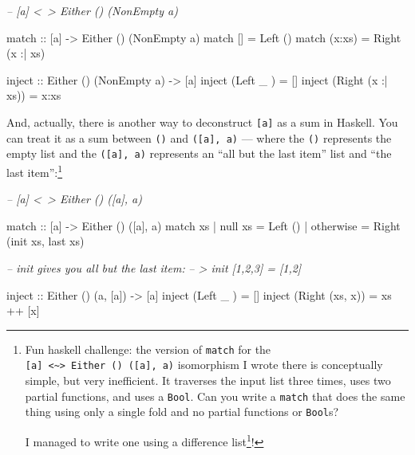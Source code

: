 \documentclass[]{article}
\newenvironment{Shaded}{}{}
\newcommand{\CommentTok}[1]{\textcolor[rgb]{0.38,0.63,0.69}{\textit{#1}}}
\newcommand{\DataTypeTok}[1]{\textcolor[rgb]{0.56,0.13,0.00}{#1}}
\newcommand{\FunctionTok}[1]{\textcolor[rgb]{0.02,0.16,0.49}{#1}}
\newcommand{\NormalTok}[1]{#1}
\newcommand{\OtherTok}[1]{\textcolor[rgb]{0.00,0.44,0.13}{#1}}
\renewcommand{\href}[2]{#2\footnote{\url{#1}}}
\begin{document}
\begin{Shaded}
\begin{Highlighting}[]
\CommentTok{-- [a] <~> Either () (NonEmpty a)}

\OtherTok{match ::}\NormalTok{ [a] }\OtherTok{->} \DataTypeTok{Either}\NormalTok{ () (}\DataTypeTok{NonEmpty}\NormalTok{ a)}
\NormalTok{match []     }\FunctionTok{=} \DataTypeTok{Left}\NormalTok{  ()}
\NormalTok{match (x}\FunctionTok{:}\NormalTok{xs) }\FunctionTok{=} \DataTypeTok{Right}\NormalTok{ (x }\FunctionTok{:|}\NormalTok{ xs)}

\OtherTok{inject ::} \DataTypeTok{Either}\NormalTok{ () (}\DataTypeTok{NonEmpty}\NormalTok{ a) }\OtherTok{->}\NormalTok{ [a]}
\NormalTok{inject (}\DataTypeTok{Left}\NormalTok{   _       ) }\FunctionTok{=}\NormalTok{ []}
\NormalTok{inject (}\DataTypeTok{Right}\NormalTok{ (x }\FunctionTok{:|}\NormalTok{ xs)) }\FunctionTok{=}\NormalTok{ x}\FunctionTok{:}\NormalTok{xs}
\end{Highlighting}
\end{Shaded}

And, actually, there is another way to deconstruct \texttt{{[}a{]}} as a sum in
Haskell. You can treat it as a sum between \texttt{()} and
\texttt{({[}a{]},\ a)} --- where the \texttt{()} represents the empty list and
the \texttt{({[}a{]},\ a)} represents an ``all but the last item'' list and
``the last item'':\footnote{Fun haskell challenge: the version of \texttt{match}
  for the
  \texttt{{[}a{]}\ \textless{}\textasciitilde{}\textgreater{}\ Either\ ()\ ({[}a{]},\ a)}
  isomorphism I wrote there is conceptually simple, but very inefficient. It
  traverses the input list three times, uses two partial functions, and uses a
  \texttt{Bool}. Can you write a \texttt{match} that does the same thing using
  only a single fold and no partial functions or \texttt{Bool}s?

  I managed to write one
  \href{https://github.com/mstksg/inCode/tree/master/code-samples/misc/lenses-and-prisms.hs\#L24-L32}{using
  a difference list}!}

\begin{Shaded}
\begin{Highlighting}[]
\CommentTok{-- [a] <~> Either () ([a], a)}

\OtherTok{match  ::}\NormalTok{ [a] }\OtherTok{->} \DataTypeTok{Either}\NormalTok{ () ([a], a)}
\NormalTok{match xs}
  \FunctionTok{|}\NormalTok{ null xs   }\FunctionTok{=} \DataTypeTok{Left}\NormalTok{  ()}
  \FunctionTok{|}\NormalTok{ otherwise }\FunctionTok{=} \DataTypeTok{Right}\NormalTok{ (init xs, last xs)}

\CommentTok{-- init gives you all but the last item:}
\CommentTok{-- > init [1,2,3] = [1,2]}

\OtherTok{inject ::} \DataTypeTok{Either}\NormalTok{ () (a, [a]) }\OtherTok{->}\NormalTok{ [a]}
\NormalTok{inject (}\DataTypeTok{Left}\NormalTok{   _     ) }\FunctionTok{=}\NormalTok{ []}
\NormalTok{inject (}\DataTypeTok{Right}\NormalTok{ (xs, x)) }\FunctionTok{=}\NormalTok{ xs }\FunctionTok{++}\NormalTok{ [x]}
\end{Highlighting}
\end{Shaded}
\end{document}
